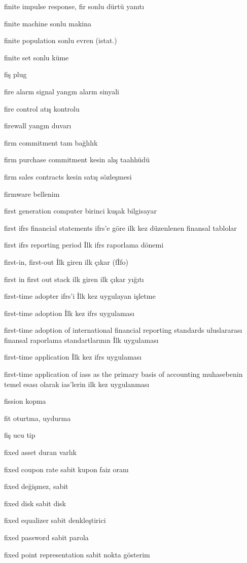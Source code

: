 \documentclass[12pt,fleqn]{article}\usepackage{../../common}
\begin{document}
finite impulse response, fir sonlu dürtü yanıtı

finite machine sonlu makina

finite population sonlu evren (istat.)

finite set sonlu küme

fiş plug

fire alarm signal yangın alarm sinyali

fire control atış kontrolu

firewall yangın duvarı

firm commitment tam bağlılık

firm purchase commitment kesin alış taahhüdü

firm sales contracts kesin satış sözleşmesi

firmware bellenim

first generation computer birinci kuşak bilgisayar

first ifrs financial statements ifrs'e göre ilk kez düzenlenen finansal tablolar

first ifrs reporting period İlk ifrs raporlama dönemi

first-in, first-out İlk giren ilk çıkar (fİfo)

first in first out stack ilk giren ilk çıkar yığıtı

first-time adopter ifrs'i İlk kez uygulayan işletme

first-time adoption İlk kez ifrs uygulaması

first-time adoption of international financial reporting standards uluslararası finansal raporlama standartlarının İlk uygulaması

first-time application İlk kez ifrs uygulaması

first-time application of iass as the primary basis of accounting muhasebenin temel esası olarak ias'lerin ilk kez uygulanması

fission kopma

fit oturtma, uydurma

fiş ucu tip

fixed asset duran varlık

fixed coupon rate sabit kupon faiz oranı

fixed değişmez, sabit

fixed disk sabit disk

fixed equalizer sabit denkleştirici

fixed password sabit parola

fixed point representation sabit nokta gösterim
\end{document}
